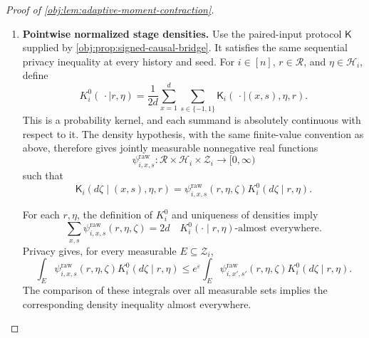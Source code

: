 \documentclass[11pt]{article}
\begin{document}
\begin{proof}[Proof of \cref{obj:lem:adaptive-moment-contraction}]
\begin{enumerate}
Now define, on the full domain
\(\mathbb R^d\times\mathcal R\times\mathcal Z\),
\[
p^Q(\theta,r)(\mathbf z)
=
\sum_{\mathbf o\in\mathcal O_d^n}
 \mathsf{mass}^{(n)}_\theta(\mathbf o)\,
 \varphi_{\mathbf o}(r,\mathbf z).
\]
This is jointly measurable and real valued. On the parameter cube its summands are nonnegative, and finite summation of the density identities gives
\[
\mathsf{Prob}^Q_{\theta,r}(d\mathbf z)
=p^Q(\theta,r)(\mathbf z)\Lambda_r^Q(d\mathbf z).
\]

For \(j\in[d]\) and \(u\in\mathbb R\), define coordinate replacement by
\[
\theta^{[j:u]}_x
=
\begin{cases}
u,&x=j,\\
\theta_x,&x\ne j.
\end{cases}
\]
Each observed-record mass obeys
\[
\mathsf{mass}^{(1)}_{\theta^{[j:u]}}(o)
=
\mathsf{mass}^{(1)}_{\theta^{[j:0]}}(o)
+\frac{\mathbf1_{\{j_o=j\}}\mathsf{sgn}_{\mathrm{obs}}(o)}{4d}\,u.
\]
Thus each sample mass, and hence \(p^Q\), is a polynomial of degree at most \(n\) in each coordinate on all of \(\mathbb R\). Its coordinate coefficients are finite linear combinations of the integrable functions \(\varphi_{\mathbf o}(r,\cdot)\), so those coefficients and all coordinate derivatives are integrable against \(\Lambda_r^Q\).

\item \textbf{Pointwise normalized stage densities.}
Use the paired-input protocol \(\mathsf K\) supplied by
\cref{obj:prop:signed-causal-bridge}. It satisfies the same sequential privacy inequality at every history and seed. For
\(i\in[n]\), \(r\in\mathcal R\), and \(\eta\in\mathcal H_i\), define
\[
K_i^0(\,\cdot\mid r,\eta)
=\frac1{2d}\sum_{x=1}^d\sum_{s\in\{-1,1\}}
 \mathsf K_i(\,\cdot\mid(x,s),\eta,r).
\]
This is a probability kernel, and each summand is absolutely continuous with respect to it. The density hypothesis, with the same finite-value convention as above, therefore gives jointly measurable nonnegative real functions
\[
\psi^{\mathrm{raw}}_{i,x,s}:
\mathcal R\times\mathcal H_i\times\mathcal Z_i\longrightarrow[0,\infty)
\]
such that
\[
\mathsf K_i(d\zeta\mid(x,s),\eta,r)
=\psi^{\mathrm{raw}}_{i,x,s}(r,\eta,\zeta)
 K_i^0(d\zeta\mid r,\eta).
\]

For each \(r,\eta\), the definition of \(K_i^0\) and uniqueness of densities imply
\[
\sum_{x,s}\psi^{\mathrm{raw}}_{i,x,s}(r,\eta,\zeta)=2d
\quad
K_i^0(\cdot\mid r,\eta)\text{-almost everywhere}.
\]
Privacy gives, for every measurable \(E\subseteq\mathcal Z_i\),
\[
\int_E\psi^{\mathrm{raw}}_{i,x,s}(r,\eta,\zeta)
 K_i^0(d\zeta\mid r,\eta)
\le
e^\varepsilon
\int_E\psi^{\mathrm{raw}}_{i,x',s'}(r,\eta,\zeta)
 K_i^0(d\zeta\mid r,\eta).
\]
The comparison of these integrals over all measurable sets implies the corresponding density inequality almost everywhere.


\end{enumerate}
\end{proof}
\end{document}
